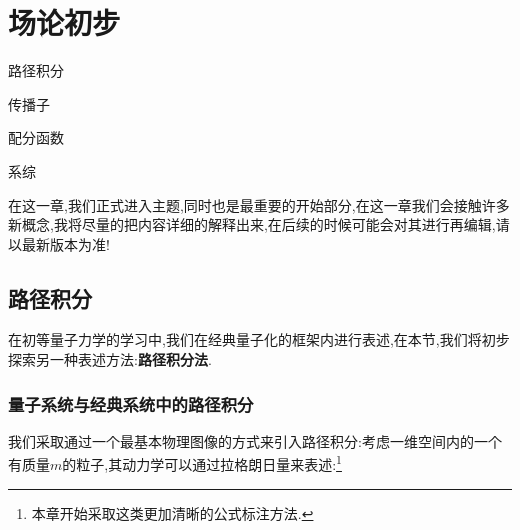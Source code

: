 \ifx\allfiles\undefined



	\else
	\fi
\chapter{场论初步}
\begin{introduction}
	\item 路径积分
	\item 传播子
	\item 配分函数
	\item 系综
\end{introduction}
\begin{comment}
	注释:可爱且漂亮的公式形式.
	\begin{equation}
		\vspace{\baselineskip}
		
		定位点a \tikzmarknode{a}{\highlight{red颜色}{$公式内容$}}
		定位点s \tikzmarknode{s}{\highlight{blue}{$公式内容$}}
		
		定位点编码标准:1eq1 (公式序号eq该公式第几个)
	\end{equation}
	\begin{tikzpicture}[overlay,remember picture,>=stealth,nodes={align=left,inner ysep=1pt},<-]
	\path (1eq1.north) ++ (0,2em) node[anchor=south east,color=red!67] (eq1/1){\textbf{动能}};
	\draw [color=red!87](1eq1.north) |- ([xshift=-0.3ex,color=red]eq1/1.south west);
	\path (1eq2.south) ++ (0,-1.5em) node[anchor=north west,color=blue!67] (eq1/2){\textbf{势能}};
	\draw [color=blue!57](1eq2.south) |- ([xshift=-0.3ex,color=blue]eq1/2.south east);
	\end{tikzpicture}
\end{comment}
在这一章,我们正式进入主题,同时也是最重要的开始部分,在这一章我们会接触许多新概念,我将尽量的把内容详细的解释出来,在后续的时候可能会对其进行再编辑,请以最新版本为准!
\section{路径积分}
在初等量子力学的学习中,我们在经典量子化的框架内进行表述,在本节,我们将初步探索另一种表述方法:\textbf{路径积分法}.
\subsection{量子系统与经典系统中的路径积分}
我们采取通过一个最基本物理图像的方式来引入路径积分:考虑一维空间内的一个有质量$ m $的粒子,其动力学可以通过拉格朗日量来表述:\footnote{本章开始采取这类更加清晰的公式标注方法.}\\
	
